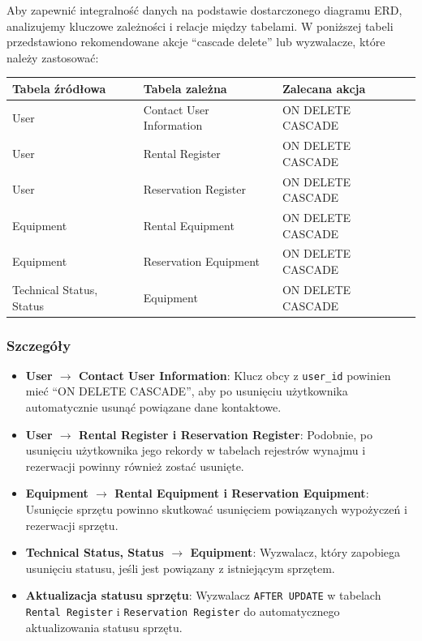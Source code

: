 \documentclass{article}
\begin{document}
Aby zapewnić integralność danych na podstawie dostarczonego diagramu ERD, analizujemy kluczowe zależności i relacje między tabelami. W poniższej tabeli przedstawiono rekomendowane akcje ``cascade delete'' lub wyzwalacze, które należy zastosować:

\begin{table}[h]
    \centering
    \begin{tabular}{|p{4cm}|p{4cm}|p{6cm}|}
        \hline
        \textbf{Tabela źródłowa} & \textbf{Tabela zależna} & \textbf{Zalecana akcja} \\
        \hline
        User & Contact User Information & ON DELETE CASCADE \\
        \hline
        User & Rental Register & ON DELETE CASCADE \\
        \hline
        User & Reservation Register & ON DELETE CASCADE \\
        \hline
        Equipment & Rental Equipment & ON DELETE CASCADE \\
        \hline
        Equipment & Reservation Equipment & ON DELETE CASCADE \\
        \hline
        Technical Status, Status & Equipment & ON DELETE CASCADE  \\
        \hline
    \end{tabular}
\end{table}

\subsubsection{Szczegóły}

\begin{itemize}
    \item \textbf{User $\rightarrow$ Contact User Information}: Klucz obcy z \texttt{user\_id} powinien mieć ``ON DELETE CASCADE'', aby po usunięciu użytkownika automatycznie usunąć powiązane dane kontaktowe.
    \item \textbf{User $\rightarrow$ Rental Register i Reservation Register}: Podobnie, po usunięciu użytkownika jego rekordy w tabelach rejestrów wynajmu i rezerwacji powinny również zostać usunięte.
    \item \textbf{Equipment $\rightarrow$ Rental Equipment i Reservation Equipment}: Usunięcie sprzętu powinno skutkować usunięciem powiązanych wypożyczeń i rezerwacji sprzętu.
    \item \textbf{Technical Status, Status $\rightarrow$ Equipment}: Wyzwalacz, który zapobiega usunięciu statusu, jeśli jest powiązany z istniejącym sprzętem.
    \item \textbf{Aktualizacja statusu sprzętu}: Wyzwalacz \texttt{AFTER UPDATE} w tabelach \texttt{Rental Register} i \texttt{Reservation Register} do automatycznego aktualizowania statusu sprzętu.
\end{itemize}
\end{document}
